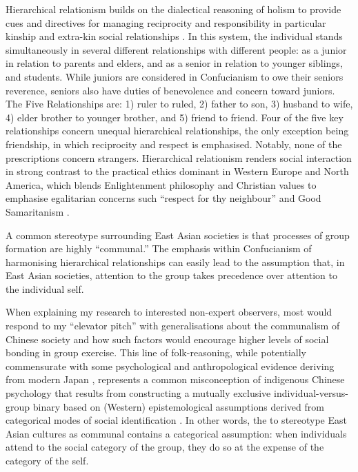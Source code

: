 \begin{CJK}{UTF8}{gbsn}
Hierarchical relationism builds on the dialectical reasoning of holism to provide cues and directives for managing reciprocity and responsibility in particular kinship and extra-kin social relationships \citep[\textit{renqing} 人情][]{Maehr1980}.   In this system, the individual stands simultaneously in several different relationships with different people: as a junior in relation to parents and elders, and as a senior in relation to younger siblings, and students. While juniors are considered in Confucianism to owe their seniors reverence, seniors also have duties of benevolence and concern toward juniors. The Five Relationships are: 1) ruler to ruled, 2) father to son, 3) husband to wife, 4) elder brother to younger brother, and 5) friend to friend. Four of the five key relationships concern unequal hierarchical relationships, the only exception being friendship, in which reciprocity and respect is emphasised.  Notably, none of the prescriptions concern strangers.  Hierarchical relationism renders social interaction in strong contrast to the practical ethics dominant in Western Europe and North America, which blends Enlightenment philosophy and Christian values to emphasise egalitarian concerns such ``respect for thy neighbour'' and Good Samaritanism \citep{Liu2005}.

A common stereotype surrounding East Asian societies is that processes of group formation are highly ``communal.''  The emphasis within Confucianism of harmonising hierarchical relationships can easily lead to the assumption that, in East Asian societies, attention to the group takes precedence over attention to the individual self.

When explaining my research to interested non-expert observers, most would respond to my ``elevator pitch'' with generalisations about the communalism of Chinese society and how such factors would encourage higher levels of social bonding in group exercise.  This line of folk-reasoning, while potentially commensurate with some psychological and anthropological evidence deriving from modern Japan \citep{Kitayama2010a}, represents a common misconception of indigenous Chinese psychology that results from constructing a mutually exclusive individual-versus-group binary based on (Western) epistemological assumptions derived from categorical modes of social identification \citep{Tu1998}.  In other words, the to stereotype East Asian cultures as communal contains a categorical assumption: when individuals attend to the social category of the group, they do so at the expense of the category of the self.


\end{CJK}
